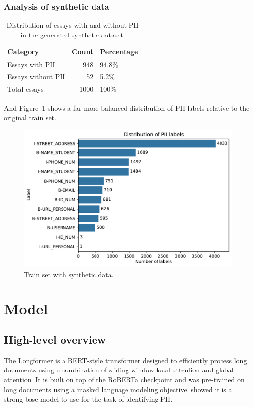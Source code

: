 \documentclass[11pt]{article}
\newcommand{\Figlink}[1]{\hyperref[#1]{Figure~\ref*{#1}}}
\begin{document}
\subsubsection{Analysis of synthetic data}

\begin{table}[h!]
  \centering
  \caption{
    Distribution of essays with and without PII in the generated synthetic dataset.}
  \label{tab:pii_distribution_synth}
  \begin{tabular}{lrl}
  \toprule
            Category &  Count & Percentage \\
  \midrule
     Essays with PII &    948 &      94.8\% \\
  Essays without PII &     52 &       5.2\% \\
        Total essays &   1000 &       100\% \\
  \bottomrule
  \end{tabular}
\end{table}

And \Figlink{fig:label_distribution_synth} shows a far more balanced distribution of PII labels relative to the original train set.

\begin{figure}[h!]
  \centering
  \includegraphics[width=\columnwidth]{images/label_distribution_synth.pdf}
  \caption{Train set with synthetic data.}
  \label{fig:label_distribution_synth}
\end{figure}

\section{Model}

\subsection{High-level overview}
The Longformer \cite{abs-2004-05150} is a BERT-style transformer designed to efficiently process long documents using a combination of sliding window local attention and global attention. It is built on top of the RoBERTa checkpoint and was pre-trained on long documents using a masked language modeling objective. \citealt{pilan-etal-2022-text} showed it is a strong base model to use for the task of identifying PII.
\end{document}
